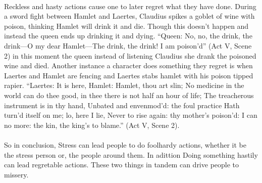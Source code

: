 \paragraph{}
Reckless and hasty actions cause one to later regret what they have done. During
a sword fight between Hamlet and Laertes, Claudius spikes a goblet of wine with
poison, thinking Hamlet will drink it and die. Though this doesn't happen and
instead the queen ends up drinking it and dying. ``Queen: No, no, the drink, the
drink---O my dear Hamlet---The drink, the drink! I am poison'd'' (Act V, Scene 2)
in this moment the queen instead of listening Claudius she drank the poisoned
wine and died. Another instance a character does something they regret is when
Laertes and Hamlet are fencing and Laertes stabs hamlet with his poison tipped
rapier. ``Laertes: It is here, Hamlet: Hamlet, thou art slin; No medicine in the
world can do thee good, in thee there is not half an hour of life; The
treacherous instrument is in thy hand, Unbated and envenmod'd: the foul practice
Hath turn'd itself on me; lo, here I lie, Never to rise again: thy mother's
poison'd: I can no more: the kin, the king's to blame.'' (Act V, Scene 2).

\paragraph{}
So in conclusion, Stress can lead people to do foolhardy actions, whether it be
the stress person or, the people around them. In adittion Doing something hastily
can lead regretable actions. These two things in tandem can drive people to missery.
